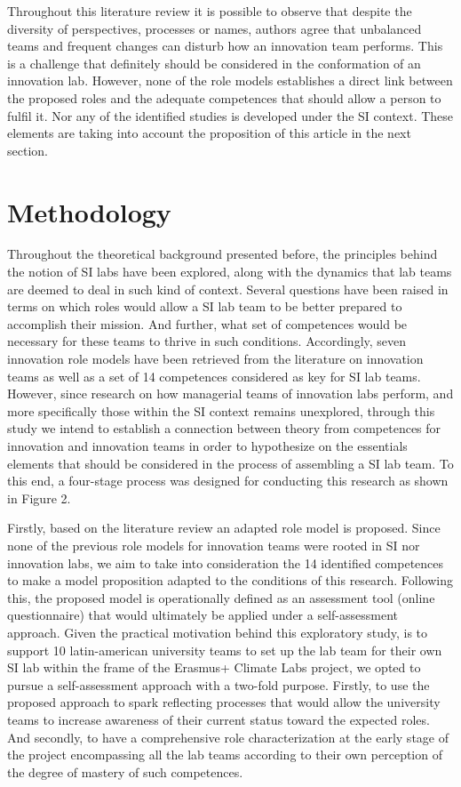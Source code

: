 \documentclass[]{elsarticle} %
\begin{document}
Throughout this literature review it is possible to observe that despite
the diversity of perspectives, processes or names, authors agree that
unbalanced teams and frequent changes can disturb how an innovation team
performs. This is a challenge that definitely should be considered in
the conformation of an innovation lab. However, none of the role models
establishes a direct link between the proposed roles and the adequate
competences that should allow a person to fulfil it. Nor any of the
identified studies is developed under the SI context. These elements are
taking into account the proposition of this article in the next section.

\hypertarget{methodology}{%
\section{Methodology}\label{methodology}}

Throughout the theoretical background presented before, the principles
behind the notion of SI labs have been explored, along with the dynamics
that lab teams are deemed to deal in such kind of context. Several
questions have been raised in terms on which roles would allow a SI lab
team to be better prepared to accomplish their mission. And further,
what set of competences would be necessary for these teams to thrive in
such conditions. Accordingly, seven innovation role models have been
retrieved from the literature on innovation teams as well as a set of 14
competences considered as key for SI lab teams. However, since research
on how managerial teams of innovation labs perform, and more
specifically those within the SI context remains unexplored, through
this study we intend to establish a connection between theory from
competences for innovation and innovation teams in order to hypothesize
on the essentials elements that should be considered in the process of
assembling a SI lab team. To this end, a four-stage process was designed
for conducting this research as shown in Figure 2.

Firstly, based on the literature review an adapted role model is
proposed. Since none of the previous role models for innovation teams
were rooted in SI nor innovation labs, we aim to take into consideration
the 14 identified competences to make a model proposition adapted to the
conditions of this research. Following this, the proposed model is
operationally defined as an assessment tool (online questionnaire) that
would ultimately be applied under a self-assessment approach. Given the
practical motivation behind this exploratory study, is to support 10
latin-american university teams to set up the lab team for their own SI
lab within the frame of the Erasmus+ Climate Labs project, we opted to
pursue a self-assessment approach with a two-fold purpose. Firstly, to
use the proposed approach to spark reflecting processes that would allow
the university teams to increase awareness of their current status
toward the expected roles. And secondly, to have a comprehensive role
characterization at the early stage of the project encompassing all the
lab teams according to their own perception of the degree of mastery of
such competences.
\end{document}
